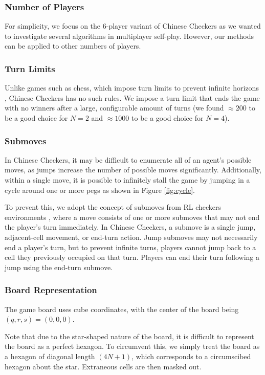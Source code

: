 \documentclass[12pt, a4paper, twocolumn]{article}
\begin{document}
\subsubsection{Number of Players}

For simplicity, we focus on the 6-player variant of Chinese Checkers as we wanted to investigate several algorithms in multiplayer self-play. However, our methods can be applied to other numbers of players.

\subsubsection{Turn Limits}

Unlike games such as chess, which impose turn limits to prevent infinite horizons \cite{ChessTurnLimit}, Chinese Checkers has no such rules. We impose a turn limit that ends the game with no winners after a large, configurable amount of turns (we found $\approx 200$ to be a good choice for $N=2$ and $\approx 1000$ to be a good choice for $N=4$).

\subsubsection{Submoves}

In Chinese Checkers, it may be difficult to enumerate all of an agent's possible moves, as jumps increase the number of possible moves significantly. Additionally, within a single move, it is possible to infinitely stall the game by jumping in a cycle around one or more pegs as shown in Figure \ref{fig:cycle}.

To prevent this, we adopt the concept of submoves from RL checkers environments \cite{RLCheckers}, where a move consists of one or more submoves that may not end the player's turn immediately. In Chinese Checkers, a submove is a single jump, adjacent-cell movement, or end-turn action. Jump submoves may not necessarily end a player's turn, but to prevent infinite turns, players cannot jump back to a cell they previously occupied on that turn. Players can end their turn following a jump using the end-turn submove.

\subsubsection{Board Representation}
The game board uses cube coordinates, with the center of the board being $(q, r, s) = (0, 0, 0)$.

Note that due to the star-shaped nature of the board, it is difficult to represent the board as a perfect hexagon. To circumvent this, we simply treat the board as a hexagon of diagonal length $(4N+1)$, which corresponds to a circumscibed hexagon about the star. Extraneous cells are then masked out. 
\end{document}
